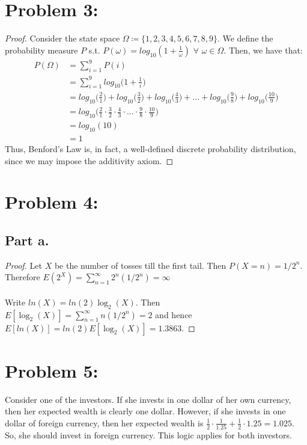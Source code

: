 \documentclass{article}
\begin{document}
\section*{Problem 3:}
\begin{proof}
Consider the state space $\Omega \coloneqq \{1, 2, 3, 4, 5, 6, 7, 8, 9\}$. We define the probability measure $P$ s.t. $P(\omega) = log_{10}(1 + \frac{1}{\omega})$ $\forall$ $\omega \in \Omega$. Then, we have that:
\begin{align*}
P(\Omega) &= \sum\limits_{i = 1}^9 P(i) \\
&= \sum\limits_{i = 1}^9 log_{10}\bigg(1 + \frac{1}{i}\bigg) \\
&= log_{10}\bigg(\frac{2}{1}\bigg) + log_{10}\bigg(\frac{3}{2}\bigg) + log_{10}\bigg(\frac{4}{3}\bigg) + ... + log_{10}\bigg(\frac{9}{8}\bigg) + log_{10}\bigg(\frac{10}{9}\bigg) \\
&= log_{10}\bigg(\frac{2}{1} \cdot \frac{3}{2} \cdot \frac{4}{3} \cdot ... \cdot \frac{9}{8} \cdot \frac{10}{9}\bigg) \\
&= log_{10}(10) \\
&= 1
\end{align*}
Thus, Benford's Law is, in fact, a well-defined discrete probability distribution, since we may impose the additivity axiom.
\end{proof}

\section*{Problem 4:}

\subsection*{Part a.}
\begin{proof}
Let $X$ be the number of tosses till the first tail. Then $P(X = n) = 1/2^n$. Therefore $E(2^X) = \sum_{n=1}^\infty 2^n (1/2^n) = \infty$ \\
\\
Write $ln(X) = ln(2)\log_2(X)$. Then
$E[\log_2(X)] = \sum_{n=1}^\infty n(1/2^n) = 2$ and hence $E[ln(X)] = ln(2)E[\log_2(X)] = 1.3863$.
\end{proof}

\section*{Problem 5:}

Consider one of the investors. If she invests in one dollar of her own currency, then her expected wealth is clearly one dollar. However, if she invests in one dollar of foreign currency, then her expected wealth is $\frac{1}{2} \cdot \frac{1}{1.25} + \frac{1}{2} \cdot 1.25 = 1.025$. So, she should invest in foreign currency. This logic applies for both investors.
\end{document}
